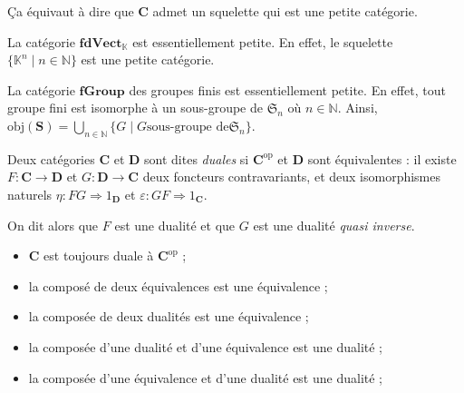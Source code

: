 \begin{rmk}
  Ça équivaut à dire que $\mathbf{C}$ admet un squelette qui est une petite catégorie.
\end{rmk}

\begin{exm}
  La catégorie $\mathbf{fdVect}_\mathds{K}$ est essentiellement petite.
  En effet, le squelette $\{\mathds{K}^n  \mid n \in \mathds{N}\}$ est une petite catégorie.

  La catégorie $\mathbf{fGroup}$ des groupes finis est essentiellement petite. En effet, tout groupe fini est isomorphe à un sous-groupe de $\mathfrak{S}_n$ où $n  \in \mathds{N}$.
  Ainsi, $\mathrm{obj}(\mathbf{S}) = \bigcup_{n \in \mathds{N}} \{G  \mid G \text{sous-groupe de} \mathfrak{S}_n\}$.
\end{exm}

\begin{defn}
  Deux catégories $\mathbf{C}$ et $\mathbf{D}$ sont dites \textit{duales} si $\mathbf{C}^\mathrm{op}$ et $\mathbf{D}$ sont équivalentes : il existe $F : \mathbf{C} \to \mathbf{D}$ et $G : \mathbf{D} \to \mathbf{C}$ deux foncteurs contravariants, et deux isomorphismes naturels $\eta : FG \Rightarrow 1_\mathbf{D}$ et $\varepsilon : GF \Rightarrow 1_\mathbf{C}$.

  On dit alors que $F$ est une dualité et que $G$ est une dualité \textit{quasi inverse}.
\end{defn}

\begin{exm}
  \begin{itemize}
    \item $\mathbf{C}$ est toujours duale à $\mathbf{C}^\mathrm{op}$ ;
    \item la composé de deux équivalences est une équivalence ;
    \item la composée de deux dualités est une équivalence ;
    \item la composée d'une dualité et d'une équivalence est une dualité ;
    \item la composée d'une équivalence et d'une dualité est une dualité ;
  \end{itemize}
\end{exm}

